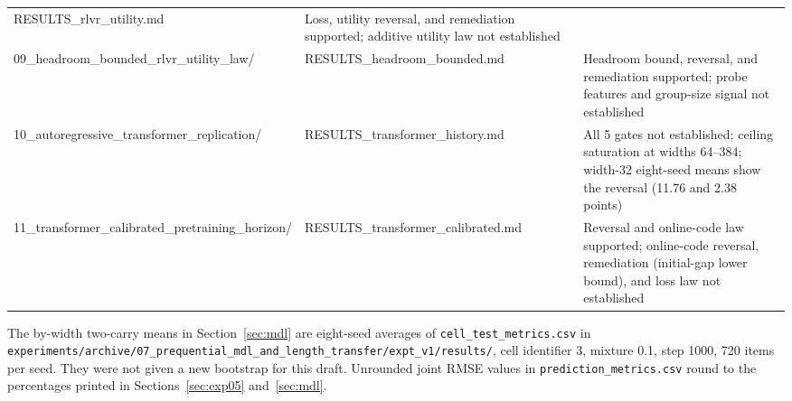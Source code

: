 \begin{table}[h]
\begin{tabular}{@{}p{}p{}p{}@{}}
RESULTS\_rlvr\_utility.md &
Loss, utility reversal, and remediation supported; additive utility law not established \\
09\_headroom\_bounded\_\allowbreak rlvr\_utility\_law/ &
RESULTS\_headroom\_bounded.md &
Headroom bound, reversal, and remediation supported; probe features and group-size signal not established \\
10\_autoregressive\_\allowbreak transformer\_replication/ &
RESULTS\_transformer\_history.md &
All 5 gates not established; ceiling saturation at widths 64--384; width-32 eight-seed means show the reversal (11.76 and 2.38 points) \\
11\_transformer\_calibrated\_\allowbreak pretraining\_horizon/ &
RESULTS\_transformer\_calibrated.md &
Reversal and online-code law supported; online-code reversal, remediation (initial-gap lower bound), and loss law not established \\
\bottomrule
\end{tabular}
\end{table}

The by-width two-carry means in Section~\ref{sec:mdl} are eight-seed averages of \texttt{cell\_test\_metrics.csv} in \texttt{experiments/archive/07\_prequential\_mdl\_and\_length\_transfer/expt\_v1/results/}, cell identifier 3, mixture 0.1, step 1000, 720 items per seed.
They were not given a new bootstrap for this draft.
Unrounded joint RMSE values in \texttt{prediction\_metrics.csv} round to the percentages printed in Sections~\ref{sec:exp05} and~\ref{sec:mdl}.
